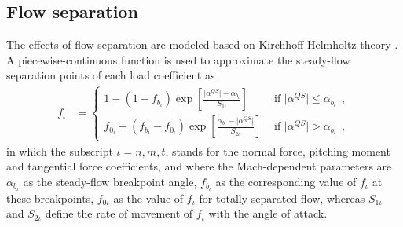 \documentclass[12pt,a4paper,oneside,english]{abntex2} %
\newcommand{\abs}[1]{\lvert#1\rvert}
\def\lb{\left[}
\def\rb{\right]}
\def\lp{\left(}
\def\rp{\right)}
\begin{document}
\subsection{Flow separation}

The effects of flow separation are modeled based on Kirchhoff-Helmholtz theory \cite{leishman1986generalised}. A piecewise-continuous function is used to approximate the steady-flow separation points of each load coefficient as
\begin{align}
    f_{\iota} &=
    \begin{cases}
        1 - \lp1-f_{b_\iota}\rp \exp\lb \frac{\abs{\alpha^{QS}}-\alpha_{b_{\iota}}}{S_{1\iota}} \rb &\text{ if } \abs{\alpha^{QS}}\leq\alpha_{b_{\iota}} \ \ ,
        \\
	f_{0_\iota} + \lp f_{b_\iota}-  
        f_{0_\iota}\rp \exp\lb \frac{\alpha_{b_{\iota}}-\abs{\alpha^{QS}}}{S_{2\iota}}\rb &\text{ 
        if } \abs{\alpha^{QS}} > \alpha_{b_{\iota}} \ \ ,
    \end{cases}
    \label{eq:f} 
\end{align} 
in which the subscript $\iota=n,m,t$, stands for the normal force, pitching moment and tangential force coefficients, and where the Mach-dependent parameters are $\alpha_{b_{\iota}}$ as the steady-flow breakpoint angle, $f_{b_\iota}$ as the corresponding value of $f_\iota$ at these breakpoints, $f_{0\iota}$ as the value of $f_\iota$ for totally separated flow, whereas $S_{1\iota}$ and $S_{2\iota}$ define the rate of movement of $f_\iota$ with the angle of attack.
\end{document}
